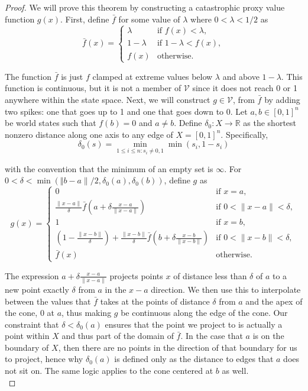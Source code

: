 \documentclass{article}
\begin{document}
\badProxyExistsContinuous* \label{sec:badProxyExistsContinuousProof}
\begin{proof}
We will prove this theorem by constructing a catastrophic proxy value function $g(x)$. First, define $\bar f$ for some value of $\lambda$ where $0 < \lambda < 1/2$ as
$$\bar{f}(x) = \begin{cases}
    \lambda & \text{if } f(x) < \lambda, \\
    1-\lambda  & \text{if } 1-\lambda < f(x), \\
    f(x) & \text{otherwise}.
\end{cases}$$

The function $\bar f$ is just $f$ clamped at extreme values below $\lambda$ and above $1-\lambda$. This function is continuous, but it is not a member of $\mathcal V$ since it does not reach 0 or 1 anywhere within the state space. Next, we will construct $g \in \mathcal V$, from $\bar f$ by adding two spikes: one that goes up to 1 and one that goes down to 0. Let $a, b \in [0,1]^n$ be world states such that $f(b) = 0$ and $a \neq b$. Define $\delta_0 : X \rightarrow \mathbb R$ as the shortest nonzero distance along one axis to any edge of $X = [0,1]^n$. Specifically,
$$\delta_0(s) = \min_{1 \leq i \leq n : s_i \neq 0,1} \min(s_i, 1-s_i)$$

with the convention that the minimum of an empty set is $\infty$. For $0 < \delta < \min(\Vert b-a \rVert/2, \delta_0(a), \delta_0(b))$, define $g$ as
$$g(x) = \begin{cases}
    0 & \text{if } x = a, \\
    \frac{\lVert x - a \rVert}{\delta} \bar f \left(a + \delta \frac{x-a}{\lVert x - a \rVert} \right) & \text{if } 0 < \lVert x - a \rVert < \delta, \\
    1 & \text{if } x = b, \\
    \left(1 - \frac{\lVert x - b \rVert}{\delta} \right) + \frac{\lVert x - b \rVert}{\delta} \bar f \left(b + \delta \frac{x-b}{\lVert x - b \rVert} \right) & \text{if } 0 < \lVert x - b \rVert < \delta, \\
    \bar{f}(x) & \text{otherwise.}
\end{cases}$$

The expression $a + \delta \frac{x-a}{\lVert x - a \rVert}$ projects points $x$ of distance less than $\delta$ of $a$ to a new point exactly $\delta$ from $a$ in the $x-a$ direction. We then use this to interpolate between the values that $\bar f$ takes at the points of distance $\delta$ from $a$ and the apex of the cone, 0 at $a$, thus making $g$ be continuous along the edge of the cone. Our constraint that $\delta < \delta_0(a)$ ensures that the point we project to is actually a point within $X$ and thus part of the domain of $\bar f$. In the case that $a$ is on the boundary of $X$, then there are no points in the direction of that boundary for us to project, hence why $\delta_0(a)$ is defined only as the distance to edges that $a$ does not sit on. The same logic applies to the cone centered at $b$ as well.\\


\end{proof}
\end{document}
